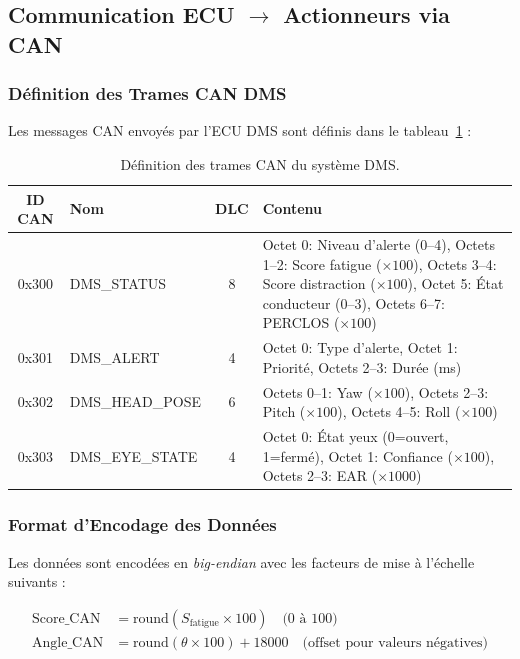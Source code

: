 \subsection{Communication ECU $\rightarrow$ Actionneurs via CAN}

\subsubsection{Définition des Trames CAN DMS}

Les messages CAN envoyés par l'ECU DMS sont définis dans le tableau~\ref{tab:can_messages} :

\begin{table}[H]
\centering
\caption{Définition des trames CAN du système DMS.}
\label{tab:can_messages}
\renewcommand{\arraystretch}{1.3}
\begin{tabularx}{\textwidth}{|c|l|c|X|}
\hline
\rowcolor{stellantisblue!15}
\textbf{ID CAN} & \textbf{Nom} & \textbf{DLC} & \textbf{Contenu} \\
\hline
0x300 & DMS\_STATUS & 8 & Octet 0: Niveau d'alerte (0--4), Octets 1--2: Score fatigue ($\times 100$), Octets 3--4: Score distraction ($\times 100$), Octet 5: État conducteur (0--3), Octets 6--7: PERCLOS ($\times 100$) \\
\hline
0x301 & DMS\_ALERT & 4 & Octet 0: Type d'alerte, Octet 1: Priorité, Octets 2--3: Durée (ms) \\
\hline
0x302 & DMS\_HEAD\_POSE & 6 & Octets 0--1: Yaw ($\times 100$), Octets 2--3: Pitch ($\times 100$), Octets 4--5: Roll ($\times 100$) \\
\hline
0x303 & DMS\_EYE\_STATE & 4 & Octet 0: État yeux (0=ouvert, 1=fermé), Octet 1: Confiance ($\times 100$), Octets 2--3: EAR ($\times 1000$) \\
\hline
\end{tabularx}
\end{table}

\subsubsection{Format d'Encodage des Données}

Les données sont encodées en \textit{big-endian} avec les facteurs de mise à l'échelle suivants :

\begin{align}
\text{Score\_CAN} &= \text{round}(S_{\text{fatigue}} \times 100) \quad \text{(0 à 100)} \label{eq:can_score} \\
\text{Angle\_CAN} &= \text{round}(\theta \times 100) + 18000 \quad \text{(offset pour valeurs négatives)} \label{eq:can_angle}
\end{align}

